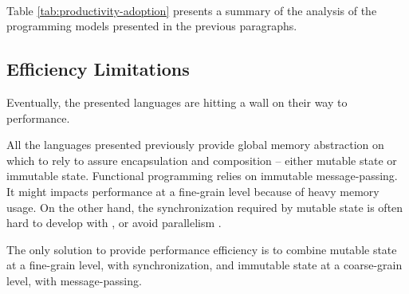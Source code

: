 
\paragraph{}

Table \ref{tab:productivity-adoption} presents a summary of the analysis of the programming models presented in the previous paragraphs.


\subsection{Efficiency Limitations} \label{chapter3:software-productivity:efficiency-limitations}

Eventually, the presented languages are hitting a wall on their way to performance.

All the languages presented previously provide global memory abstraction on which to rely to assure encapsulation and composition -- either mutable state or immutable state.
Functional programming relies on immutable message-passing.
It might impacts performance at a fine-grain level because of heavy memory usage.
On the other hand, the synchronization required by mutable state is often hard to develop with \cite{Adya2002}, or avoid parallelism \cite{Pai1999,Krohn2007}.

The only solution to provide performance efficiency is to combine mutable state at a fine-grain level, with synchronization, and immutable state at a coarse-grain level, with message-passing.




